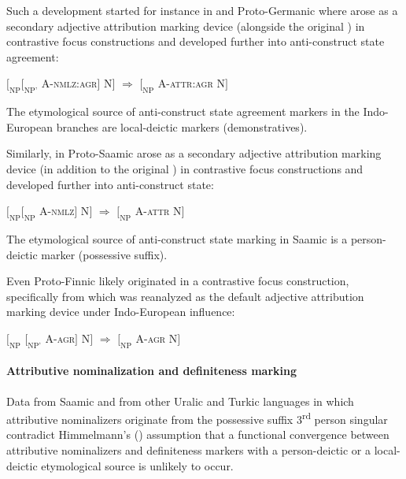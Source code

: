 Such a development started for instance in  and Proto\hyp{}Germanic where  arose as a secondary adjective attribution marking device (alongside the original ) in contrastive focus constructions and developed further into anti\hyp{}construct state agreement:
\begin{exe}
\ex \rm{$[_{\text{NP}} [_{\text{NP'}}$ A-\textsc{nmlz:agr}$]$ N$]$ $\Rightarrow$ $[_{\text{NP}}$ A-\textsc{attr:agr} N$]$}
\end{exe}
The etymological source of anti\hyp{}construct state agreement markers in the Indo-European branches are local-deictic markers (demonstratives).

Similarly, in Proto\hyp{}Saamic  arose as a secondary adjective attribution marking device (in addition to the original ) in contrastive focus constructions and developed further into anti\hyp{}construct state:
\begin{exe}
\ex \rm{$[_{\text{NP}} [_{\text{NP}}$ A-\textsc{nmlz}$]$ N$]$ $\Rightarrow$ $[_{\text{NP}}$ A-\textsc{attr} N$]$}
\end{exe}
The etymological source of anti\hyp{}construct state marking in Saamic is a person-deictic marker (possessive suffix).

Even Proto\hyp{}Finnic  likely originated in a contrastive focus construction, specifically from  which was reanalyzed as the default adjective attribution marking device under Indo-European influence:
\begin{exe}
\ex \rm{$[_{\text{NP}}$ $[_{\text{NP'}}$ A-\textsc{agr}$]$ N$]$ $\Rightarrow$ $[_{\text{NP}}$ A-\textsc{agr} N$]$}
\end{exe}

\paragraph*{Attributive nominalization and definiteness marking}
Data from Saamic and from other Uralic and Turkic languages in which attributive nominalizers originate from the possessive suffix 3\textsuperscript{rd} person singular contradict Himmelmann's (\citeyear[220–221]{himmelmann1997}) assumption that a functional convergence between attributive nominalizers and definiteness markers with a person-deictic or a local-deictic etymological source is unlikely to occur. 

